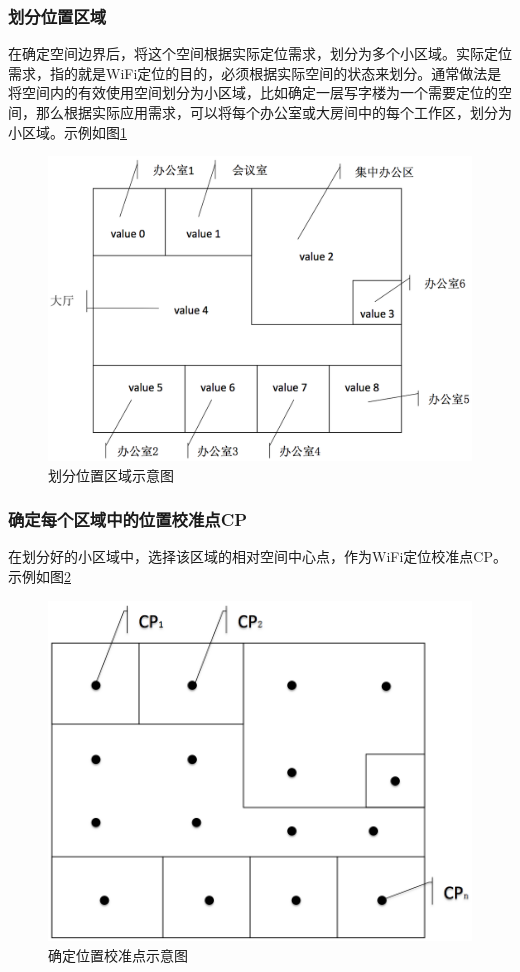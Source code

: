 \documentclass[UTF8, twocolumn ]{ctexart}
\begin{document}
\subsubsection{划分位置区域}
在确定空间边界后，将这个空间根据实际定位需求，划分为多个小区域。实际定位需求，指的就是WiFi定位的目的，必须根据实际空间的状态来划分。通常做法是将空间内的有效使用空间划分为小区域，比如确定一层写字楼为一个需要定位的空间，那么根据实际应用需求，可以将每个办公室或大房间中的每个工作区，划分为小区域。示例如图\ref{fig:no3}
\begin{figure}[!ht]\centering
  \includegraphics[keepaspectratio, scale=0.2]{no3.png}
  \caption{划分位置区域示意图\label{fig:no3}} 
\end{figure}

\subsubsection{确定每个区域中的位置校准点CP}
在划分好的小区域中，选择该区域的相对空间中心点，作为WiFi定位校准点CP。示例如图\ref{fig:no4}
\begin{figure}[!ht]\centering
  \includegraphics[keepaspectratio, scale=0.2]{no4.png}
  \caption{确定位置校准点示意图\label{fig:no4}} 
\end{figure}
\end{document}
